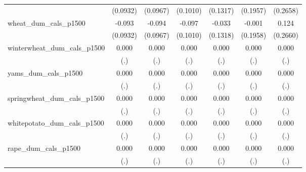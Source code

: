 {\begin{tabular}{l*{6}{c}}
                    &    (0.0932)         &    (0.0967)         &    (0.1010)         &    (0.1317)         &    (0.1957)         &    (0.2658)         \\
\addlinespace
wheat\_dum\_cals\_p1500&      -0.093         &      -0.094         &      -0.097         &      -0.033         &      -0.001         &       0.124         \\
                    &    (0.0932)         &    (0.0967)         &    (0.1010)         &    (0.1318)         &    (0.1958)         &    (0.2660)         \\
\addlinespace
winterwheat\_dum\_cals\_p1500&       0.000         &       0.000         &       0.000         &       0.000         &       0.000         &       0.000         \\
                    &         (.)         &         (.)         &         (.)         &         (.)         &         (.)         &         (.)         \\
\addlinespace
yams\_dum\_cals\_p1500 &       0.000         &       0.000         &       0.000         &       0.000         &       0.000         &       0.000         \\
                    &         (.)         &         (.)         &         (.)         &         (.)         &         (.)         &         (.)         \\
\addlinespace
springwheat\_dum\_cals\_p1500&       0.000         &       0.000         &       0.000         &       0.000         &       0.000         &       0.000         \\
                    &         (.)         &         (.)         &         (.)         &         (.)         &         (.)         &         (.)         \\
\addlinespace
whitepotato\_dum\_cals\_p1500&       0.000         &       0.000         &       0.000         &       0.000         &       0.000         &       0.000         \\
                    &         (.)         &         (.)         &         (.)         &         (.)         &         (.)         &         (.)         \\
\addlinespace
rape\_dum\_cals\_p1500 &       0.000         &       0.000         &       0.000         &       0.000         &       0.000         &       0.000         \\
                    &         (.)         &         (.)         &         (.)         &         (.)         &         (.)         &         (.)         \\

\end{tabular}}
